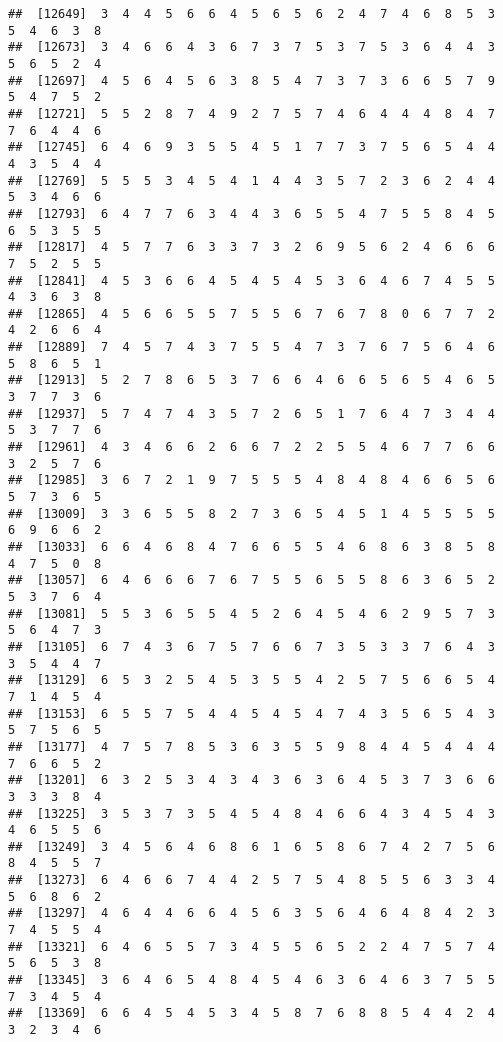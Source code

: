 \documentclass[
]{book}
\begin{document}
\begin{verbatim}
##  [12649]  3  4  4  5  6  6  4  5  6  5  6  2  4  7  4  6  8  5  3  5  4  6  3  8
##  [12673]  3  4  6  6  4  3  6  7  3  7  5  3  7  5  3  6  4  4  3  5  6  5  2  4
##  [12697]  4  5  6  4  5  6  3  8  5  4  7  3  7  3  6  6  5  7  9  5  4  7  5  2
##  [12721]  5  5  2  8  7  4  9  2  7  5  7  4  6  4  4  4  8  4  7  7  6  4  4  6
##  [12745]  6  4  6  9  3  5  5  4  5  1  7  7  3  7  5  6  5  4  4  4  3  5  4  4
##  [12769]  5  5  5  3  4  5  4  1  4  4  3  5  7  2  3  6  2  4  4  5  3  4  6  6
##  [12793]  6  4  7  7  6  3  4  4  3  6  5  5  4  7  5  5  8  4  5  6  5  3  5  5
##  [12817]  4  5  7  7  6  3  3  7  3  2  6  9  5  6  2  4  6  6  6  7  5  2  5  5
##  [12841]  4  5  3  6  6  4  5  4  5  4  5  3  6  4  6  7  4  5  5  4  3  6  3  8
##  [12865]  4  5  6  6  5  5  7  5  5  6  7  6  7  8  0  6  7  7  2  4  2  6  6  4
##  [12889]  7  4  5  7  4  3  7  5  5  4  7  3  7  6  7  5  6  4  6  5  8  6  5  1
##  [12913]  5  2  7  8  6  5  3  7  6  6  4  6  6  5  6  5  4  6  5  3  7  7  3  6
##  [12937]  5  7  4  7  4  3  5  7  2  6  5  1  7  6  4  7  3  4  4  5  3  7  7  6
##  [12961]  4  3  4  6  6  2  6  6  7  2  2  5  5  4  6  7  7  6  6  3  2  5  7  6
##  [12985]  3  6  7  2  1  9  7  5  5  5  4  8  4  8  4  6  6  5  6  5  7  3  6  5
##  [13009]  3  3  6  5  5  8  2  7  3  6  5  4  5  1  4  5  5  5  5  6  9  6  6  2
##  [13033]  6  6  4  6  8  4  7  6  6  5  5  4  6  8  6  3  8  5  8  4  7  5  0  8
##  [13057]  6  4  6  6  6  7  6  7  5  5  6  5  5  8  6  3  6  5  2  5  3  7  6  4
##  [13081]  5  5  3  6  5  5  4  5  2  6  4  5  4  6  2  9  5  7  3  5  6  4  7  3
##  [13105]  6  7  4  3  6  7  5  7  6  6  7  3  5  3  3  7  6  4  3  3  5  4  4  7
##  [13129]  6  5  3  2  5  4  5  3  5  5  4  2  5  7  5  6  6  5  4  7  1  4  5  4
##  [13153]  6  5  5  7  5  4  4  5  4  5  4  7  4  3  5  6  5  4  3  5  7  5  6  5
##  [13177]  4  7  5  7  8  5  3  6  3  5  5  9  8  4  4  5  4  4  4  7  6  6  5  2
##  [13201]  6  3  2  5  3  4  3  4  3  6  3  6  4  5  3  7  3  6  6  3  3  3  8  4
##  [13225]  3  5  3  7  3  5  4  5  4  8  4  6  6  4  3  4  5  4  3  4  6  5  5  6
##  [13249]  3  4  5  6  4  6  8  6  1  6  5  8  6  7  4  2  7  5  6  8  4  5  5  7
##  [13273]  6  4  6  6  7  4  4  2  5  7  5  4  8  5  5  6  3  3  4  5  6  8  6  2
##  [13297]  4  6  4  4  6  6  4  5  6  3  5  6  4  6  4  8  4  2  3  7  4  5  5  4
##  [13321]  6  4  6  5  5  7  3  4  5  5  6  5  2  2  4  7  5  7  4  5  6  5  3  8
##  [13345]  3  6  4  6  5  4  8  4  5  4  6  3  6  4  6  3  7  5  5  7  3  4  5  4
##  [13369]  6  6  4  5  4  5  3  4  5  8  7  6  8  8  5  4  4  2  4  3  2  3  4  6

\end{verbatim}
\end{document}

